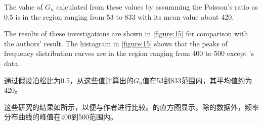 \begin{paracol}{2}
    \switchcolumn*
    
    The value of $G_n$ calculated from these values by assumming the Poisson's ratio as 0.5 is in the region ranging from 53 to 833 with its mean value about 420. 
    
    The results of these investigations are shown in \autoref{figure:15} for comparison with the authors' result. The histogram in \autoref{figure:15} shows that the peaks of frequency distribution curves are in the region ranging from 400 to 500 except \citet{Hardin1973667}'s data.

    \switchcolumn
       
    通过假设泊松比为0.5，从这些值计算出的$G_n$值在53到833范围内，其平均值约为420。
       
    这些研究的结果如所示，以便与作者进行比较。的直方图显示，除\citet{Hardin1973667}的数据外，频率分布曲线的峰值在400到500范围内。
    
\end{paracol}